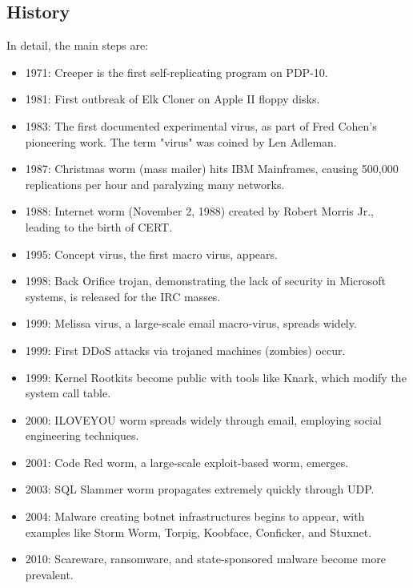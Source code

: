 \subsection{History}
In detail, the main steps are: 
\begin{itemize}
    \item 1971: Creeper is the first self-replicating program on PDP-10.
    \item 1981: First outbreak of Elk Cloner on Apple II floppy disks.
    \item 1983: The first documented experimental virus, as part of Fred Cohen's pioneering work. The term "virus" was coined by Len Adleman.
    \item 1987: Christmas worm (mass mailer) hits IBM Mainframes, causing 500,000 replications per hour and paralyzing many networks.
    \item 1988: Internet worm (November 2, 1988) created by Robert Morris Jr., leading to the birth of CERT.
    \item 1995: Concept virus, the first macro virus, appears.
    \item 1998: Back Orifice trojan, demonstrating the lack of security in Microsoft systems, is released for the IRC masses.
    \item 1999: Melissa virus, a large-scale email macro-virus, spreads widely.
    \item 1999: First DDoS attacks via trojaned machines (zombies) occur.
    \item 1999: Kernel Rootkits become public with tools like Knark, which modify the system call table.
    \item 2000: ILOVEYOU worm spreads widely through email, employing social engineering techniques.
    \item 2001: Code Red worm, a large-scale exploit-based worm, emerges.
    \item 2003: SQL Slammer worm propagates extremely quickly through UDP.
    \item 2004: Malware creating botnet infrastructures begins to appear, with examples like Storm Worm, Torpig, Koobface, Conficker, and Stuxnet.
    \item 2010: Scareware, ransomware, and state-sponsored malware become more prevalent.
\end{itemize}